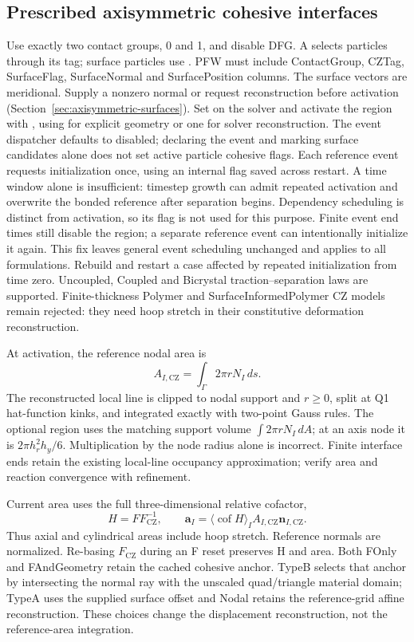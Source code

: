 \subsection{Prescribed axisymmetric cohesive interfaces}
Use exactly two contact groups, 0 and 1, and disable DFG. A
 selects particles through its tag; surface
particles use . PFW must include ContactGroup, CZTag,
SurfaceFlag, SurfaceNormal and SurfacePosition columns. The surface vectors
are meridional. Supply a nonzero normal or request reconstruction before
activation (Section~\ref{sec:axisymmetric-surfaces}). Set  on the
solver and activate the region with
, using  for explicit geometry or one
for solver reconstruction.
The event dispatcher defaults to disabled; declaring the event and marking
surface candidates alone does not set active particle cohesive flags.
Each reference event requests initialization once, using an internal
 flag saved across restart. A time window alone is
insufficient: timestep growth can admit repeated activation and overwrite the
bonded reference after separation begins. Dependency scheduling is distinct
from activation, so its  flag is not used for this purpose.
Finite event end times still disable the region; a separate reference event
can intentionally initialize it again. This fix leaves general event
scheduling unchanged and applies to all formulations. Rebuild and restart a
case affected by repeated initialization from time zero.
Uncoupled, Coupled and Bicrystal traction--separation laws are supported.
Finite-thickness Polymer and SurfaceInformedPolymer CZ models remain rejected:
they need hoop stretch in their constitutive deformation reconstruction.

At activation, the reference nodal area is
\[
 A_{I,\mathrm{CZ}}=\int_{\Gamma}2\pi r N_I\,ds.
\]
The reconstructed local line is clipped to nodal support and $r\geq0$, split
at Q1 hat-function kinks, and integrated exactly with two-point Gauss rules.
The optional region  uses the matching support
volume $\int 2\pi r N_I\,dA$; at an axis node it is
$2\pi h_r^2h_y/6$. Multiplication by the node radius alone is incorrect.
Finite interface ends retain the existing local-line occupancy approximation;
verify area and reaction convergence with refinement.

Current area uses the full three-dimensional relative cofactor,
\[
 H=F F_{\mathrm{CZ}}^{-1},\qquad
 \mathbf a_I=\langle\operatorname{cof}H\rangle_I
              A_{I,\mathrm{CZ}}\mathbf n_{I,\mathrm{CZ}}.
\]
Thus axial and cylindrical areas include hoop stretch. Reference normals are
normalized. Re-basing $F_{\mathrm{CZ}}$ during an F reset preserves H and area.
Both FOnly and FAndGeometry retain the cached cohesive anchor. TypeB selects
that anchor by intersecting the normal ray with the unscaled quad/triangle
material domain; TypeA uses the supplied surface offset and Nodal retains the
reference-grid affine reconstruction. These choices change the displacement
reconstruction, not the reference-area integration.

